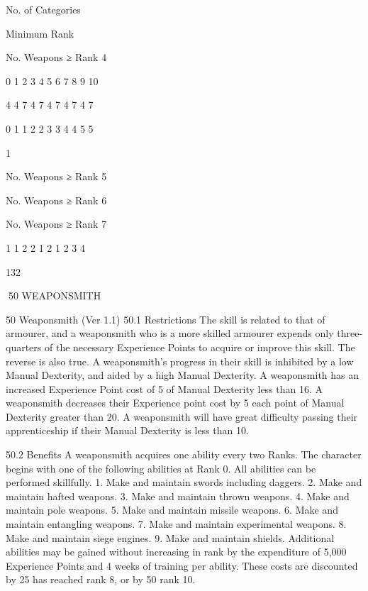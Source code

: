 \documentclass[a4paper]{article}
\begin{document}
\begin{multicols}{3}
No. of Categories

Minimum Rank

No. Weapons ≥
Rank 4

0
1
2
3
4
5
6
7
8
9
10

4
4
7
4
7
4
7
4
7
4
7

0
1
1
2
2
3
3
4
4
5
5

1

No. Weapons ≥
Rank 5

No. Weapons ≥
Rank 6

No. Weapons ≥
Rank 7

1
1
2
2
1
2
1
2
3
4

132

50 WEAPONSMITH

50 Weaponsmith (Ver 1.1)
50.1 Restrictions
The skill is related to that of armourer, and a
weaponsmith who is a more skilled armourer expends only three-quarters of the necessary Experience Points to acquire or improve this skill. The
reverse is also true.
A weaponsmith’s progress in their skill is inhibited
by a low Manual Dexterity, and aided by a high
Manual Dexterity. A weaponsmith has an increased Experience Point cost of 5%
of Manual Dexterity less than 16. A weaponsmith
decreases their Experience point cost by 5%
each point of Manual Dexterity greater than 20. A
weaponsmith will have great difficulty passing
their apprenticeship if their Manual Dexterity is
less than 10.

50.2 Benefits
A weaponsmith acquires one ability every two
Ranks. The character begins with one of the
following abilities at Rank
0. All abilities can be performed skillfully.
1. Make and maintain swords including daggers.
2. Make and maintain hafted weapons.
3. Make and maintain thrown weapons.
4. Make and maintain pole weapons.
5. Make and maintain missile weapons.
6. Make and maintain entangling weapons.
7. Make and maintain experimental weapons.
8. Make and maintain siege engines.
9. Make and maintain shields.
Additional abilities may be gained without increasing in rank by the expenditure of 5,000 Experience
Points and 4 weeks of training per ability. These
costs are discounted by 25%
has reached rank 8, or by 50%
rank 10.


\end{multicols}
\end{document}
